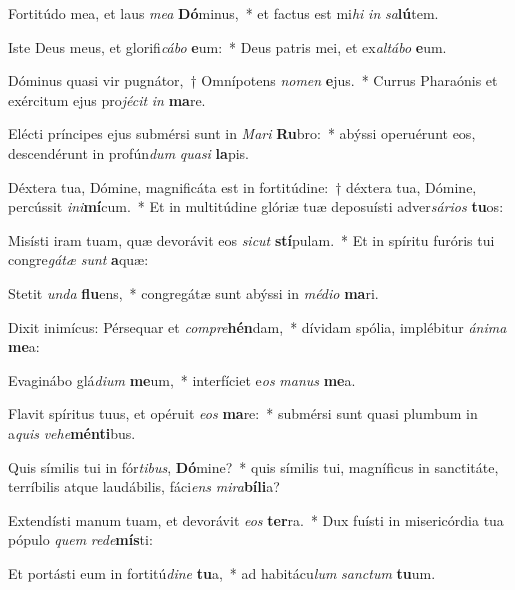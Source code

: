 \item Fortitúdo mea, et laus \textit{me}\textit{a} \textbf{Dó}minus,~* et factus est mi\textit{hi} \textit{in} \textit{sa}\textbf{lú}tem.
\item Iste Deus meus, et glorifi\textit{cá}\textit{bo} \textbf{e}um:~* Deus patris mei, et ex\textit{al}\textit{tá}\textit{bo} \textbf{e}um.
\item Dóminus quasi vir pugnátor,~† Omnípotens \textit{no}\textit{men} \textbf{e}jus.~* Currus Pharaónis et exércitum ejus pro\textit{jé}\textit{cit} \textit{in} \textbf{ma}re.
\item Elécti príncipes ejus submérsi sunt in \textit{Ma}\textit{ri} \textbf{Ru}bro:~* abýssi operuérunt eos, descendérunt in profún\textit{dum} \textit{qua}\textit{si} \textbf{la}pis.
\item Déxtera tua, Dómine, magnificáta est in fortitúdine:~† déxtera tua, Dómine, percússit \textit{in}\textit{i}\textbf{mí}cum.~* Et in multitúdine glóriæ tuæ deposuísti adver\textit{sá}\textit{ri}\textit{os} \textbf{tu}os:
\item Misísti iram tuam, quæ devorávit eos \textit{sic}\textit{ut} \textbf{stí}pulam.~* Et in spíritu furóris tui congre\textit{gá}\textit{tæ} \textit{sunt} \textbf{a}quæ:
\item Stetit \textit{un}\textit{da} \textbf{flu}ens,~* congregátæ sunt abýssi in \textit{mé}\textit{di}\textit{o} \textbf{ma}ri.
\item Dixit inimícus: Pérsequar et \textit{com}\textit{pre}\textbf{hén}dam,~* dívidam spólia, implébitur \textit{á}\textit{ni}\textit{ma} \textbf{me}a:
\item Evaginábo glá\textit{di}\textit{um} \textbf{me}um,~* interfíciet e\textit{os} \textit{ma}\textit{nus} \textbf{me}a.
\item Flavit spíritus tuus, et opéruit \textit{e}\textit{os} \textbf{ma}re:~* submérsi sunt quasi plumbum in a\textit{quis} \textit{ve}\textit{he}\textbf{mén}\textbf{ti}bus.
\item Quis símilis tui in fór\textit{ti}\textit{bus}, \textbf{Dó}mine?~* quis símilis tui, magníficus in sanctitáte, terríbilis atque laudábilis, fáci\textit{ens} \textit{mi}\textit{ra}\textbf{bí}\textbf{li}a?
\item Extendísti manum tuam, et devorávit \textit{e}\textit{os} \textbf{ter}ra.~* Dux fuísti in misericórdia tua pópulo \textit{quem} \textit{red}\textit{e}\textbf{mís}ti:
\item Et portásti eum in fortitú\textit{di}\textit{ne} \textbf{tu}a,~* ad habitácu\textit{lum} \textit{sanc}\textit{tum} \textbf{tu}um.
